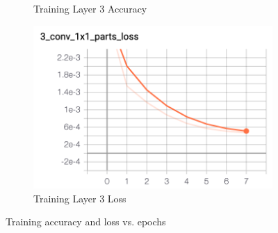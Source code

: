 \documentclass[11pt, letterpaper]{article}
\begin{document}
\begin{figure}[h]
\begin{subfigure}{0.4\textwidth}
        \caption{Training Layer 3 Accuracy}
    \end{subfigure}
    \begin{subfigure}{0.4\textwidth}
        \centering
        \includegraphics[width=0.8\linewidth]{train_layer_3_loss.png}
        \caption{Training Layer 3 Loss}
    \end{subfigure}
    \caption{Training accuracy and loss vs. epochs}
    \label{fig:hg_4_train}
\end{figure}
\end{document}
